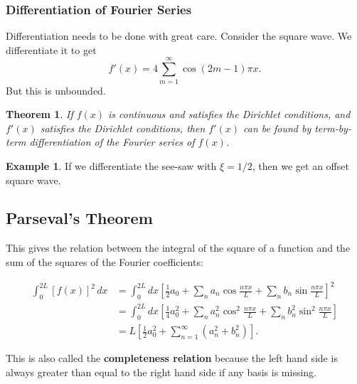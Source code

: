 \documentclass[12pt]{article}
\newtheorem{theorem}{Theorem}[section]
\theoremstyle{definition}
\newtheorem{example}{Example}[section]
\theoremstyle{remark}
\begin{document}
\subsubsection{Differentiation of Fourier Series}%
\label{subsub:differentiation_of_fourier_series}

Differentiation needs to be done with great care. Consider the square wave. We differentiate it to get
\[
	f'(x) = 4 \sum_{m = 1}^{\infty} \cos (2m - 1) \pi x
.\]
But this is unbounded.

\begin{theorem}
	If $f(x)$ is continuous and satisfies the Dirichlet conditions, and $f'(x)$ satisfies the Dirichlet conditions, then $f'(x)$ can be found by term-by-term differentiation of the Fourier series of $f(x)$.
\end{theorem}

\begin{adjustbox}{minipage = \columnwidth - 25.5pt, margin=1em, frame=1pt, margin=0em}
\begin{example}
	If we differentiate the see-saw with $\xi = 1/2$, then we get an offset square wave.
\end{example}

\end{adjustbox}

\subsection{Parseval's Theorem}%
\label{sub:parseval_s_theorem}

This gives the relation between the integral of the square of a function and the sum of the squares of the Fourier coefficients:

\begin{align*}
	\int_{0}^{2L}[f(x)]^2\, dx &= \int_{0}^{2L} dx \left[ \frac{1}{2} a_0 + \sum_{n}a_n \cos \frac{n \pi x}{L} + \sum_{n}b_n \sin \frac{n \pi x}{L} \right]^2 \\
				   &= \int_{0}^{2L} dx \left[ \frac{1}{4} a_0^2 + \sum_{n} a_n^2 \cos^2 \frac{n \pi x}{L} + \sum_{n} b_n^2 \sin^2 \frac{n \pi x}{L} \right]\\
				   &= L \left[ \frac{1}{2} a_0^2 + \sum_{n = 1}^{\infty} (a_n^2 + b_n^2) \right].
\end{align*}

This is also called the \textbf{completeness relation} because the left hand side is always greater than equal to the right hand side if any basis is missing.
\end{document}
